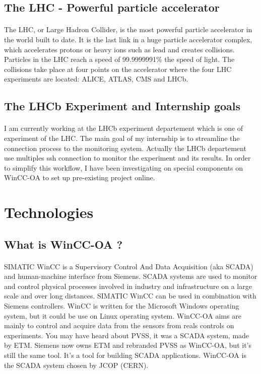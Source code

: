 \documentclass[a4paper, 12pt]{article}
\begin{document}
\subsection{The LHC - Powerful particle accelerator}
\paragraph{}
The LHC, or Large Hadron Collider, is the most powerful particle accelerator in the world built to date. 
It is the last link in a huge particle accelerator complex, which accelerates protons or heavy ions such as lead and creates collisions. 
Particles in the LHC reach a speed of 99.9999991\% the speed of light. 
The collisions take place at four points on the accelerator where the four LHC experiments are located: ALICE, ATLAS, CMS and LHCb.

\subsection{The LHCb Experiment and Internship goals}
\paragraph{}
I am currently working at the LHCb experiment departement which is one of experiment of the LHC.
The main goal of my internship is to streamline the connection process to the monitoring system. 
Actually the LHCb departement use multiples ssh connection to monitor the experiment and its results. 
In order to simplify this workflow, I have been investigating on special components on WinCC-OA to set up pre-existing project online.

\section{Technologies}
\subsection{What is WinCC-OA ?}
\paragraph{}
SIMATIC WinCC is a Supervisory Control And Data Acquisition (aka SCADA) and human-machine interface from Siemens. 
SCADA systems are used to monitor and control physical processes involved in industry and infrastructure on a large scale and over long distances. 
SIMATIC WinCC can be used in combination with Siemens controllers. 
WinCC is written for the Microsoft Windows operating system, but it could be use on Linux operating system. 
WinCC-OA aims are mainly to control and acquire data from the sensors from reals controls on experiments.
You may have heard about PVSS, it was a SCADA system, made by ETM. 
Siemens now owns ETM and rebranded PVSS as WinCC-OA, but it's still the same tool. 
It's a tool for building SCADA applications. WinCC-OA is the SCADA system chosen by JCOP (CERN).
\end{document}
